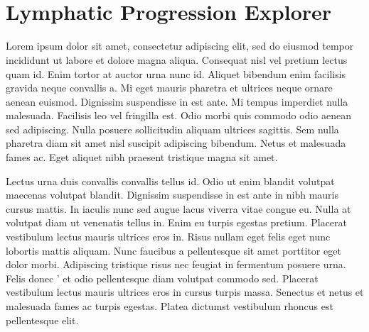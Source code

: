 \documentclass[\relativeRoot/main.tex]{subfiles}
\begin{document}
\chapter[LyProX -- Lymphatic Progression Explorer]{\hspace{0.3mm}\\[0.5ex]\large{Lymphatic Progression Explorer}}

Lorem ipsum dolor sit amet, consectetur adipiscing elit, sed do eiusmod tempor incididunt ut labore et dolore magna aliqua. Consequat nisl vel pretium lectus quam id. Enim tortor at auctor urna nunc id. Aliquet bibendum enim facilisis gravida neque convallis a. Mi eget mauris pharetra et ultrices neque ornare aenean euismod. Dignissim suspendisse in est ante. Mi tempus imperdiet nulla malesuada. Facilisis leo vel fringilla est. Odio morbi quis commodo odio aenean sed adipiscing. Nulla posuere sollicitudin aliquam ultrices sagittis. Sem \inlinelyproxlogo{} nulla pharetra diam sit amet nisl suscipit adipiscing bibendum. Netus et malesuada fames ac. Eget aliquet nibh praesent tristique magna sit amet.

Lectus urna duis convallis convallis tellus id. Odio ut enim blandit volutpat maecenas volutpat blandit. Dignissim suspendisse in est ante in nibh mauris cursus mattis. In iaculis nunc sed augue lacus viverra vitae congue eu. Nulla at volutpat diam ut venenatis tellus in. Enim eu turpis egestas pretium. Placerat vestibulum lectus mauris ultrices eros in. Risus nullam eget felis eget nunc lobortis mattis aliquam. Nunc faucibus a pellentesque sit amet porttitor eget dolor morbi. Adipiscing tristique risus nec feugiat in fermentum posuere urna. Felis donec \inlinelyproxlogo{}' et odio pellentesque diam volutpat commodo sed. Placerat vestibulum lectus mauris ultrices eros in cursus turpis massa. Senectus et netus et malesuada fames ac turpis egestas. Platea dictumst vestibulum rhoncus est pellentesque elit.

\end{document}
